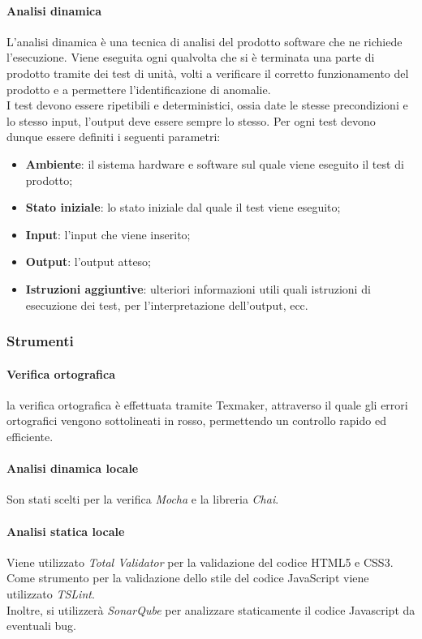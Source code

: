\documentclass[11pt,a4paper]{article}
\begin{document}
{	\paragraph{Analisi dinamica\\}
	L'analisi dinamica è una tecnica di analisi del prodotto software che ne richiede l'esecuzione. Viene eseguita ogni qualvolta che si è terminata una parte di prodotto tramite dei test di unità, volti a verificare il corretto funzionamento del prodotto e a permettere l'identificazione di anomalie. \\
	I test devono essere ripetibili e deterministici, ossia date le stesse precondizioni e lo stesso input, l'output deve essere sempre lo stesso. Per ogni test devono dunque essere definiti i seguenti parametri:
	\begin{itemize}
		\item \textbf{Ambiente}: il sistema hardware e software sul quale viene eseguito il test di prodotto;
		\item \textbf{Stato iniziale}: lo stato iniziale dal quale il test viene eseguito;
		\item \textbf{Input}: l'input che viene inserito;
		\item \textbf{Output}: l'output atteso;
		\item \textbf{Istruzioni aggiuntive}: ulteriori informazioni utili quali istruzioni di esecuzione dei test, per l'interpretazione dell'output, ecc. 
	\end{itemize}
		
	\subsubsection{Strumenti}	
	\paragraph{Verifica ortografica\\}
	la verifica ortografica è effettuata tramite Texmaker, attraverso il quale gli errori ortografici vengono sottolineati in rosso, permettendo un controllo rapido ed efficiente.
	\paragraph{Analisi dinamica locale\\}
	Son stati scelti per la verifica \textit{Mocha} e la libreria \textit{Chai}. 
	\paragraph{Analisi statica locale\\}
	Viene utilizzato \textit{Total Validator} per la validazione del codice HTML5 e CSS3. \\
	Come strumento per la validazione dello stile del codice JavaScript viene utilizzato \textit{TSLint}. \\
	Inoltre, si utilizzerà \textit{SonarQube} per analizzare staticamente il codice Javascript da eventuali bug.
	
}
\end{document}
